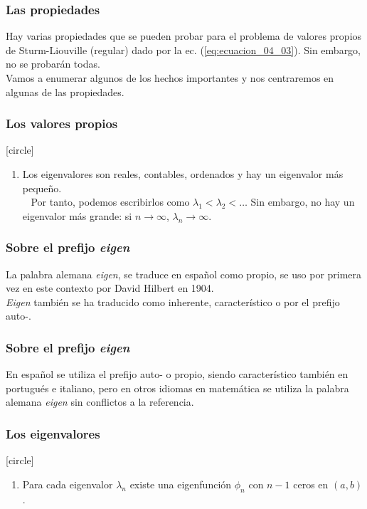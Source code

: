 \documentclass[12pt]{beamer}
\begin{document}
\begin{frame}
\frametitle{Las propiedades}
Hay varias propiedades que se pueden probar para el problema de valores propios de Sturm-Liouville (regular) dado por la ec. (\ref{eq:ecuacion_04_03}). Sin embargo, no se probarán todas.
\\
\bigskip
\pause
Vamos a enumerar algunos de los hechos importantes y nos centraremos en algunas de las propiedades.
\end{frame}
\begin{frame}
\frametitle{Los valores propios}
[circle]
\begin{enumerate}[<+->]
\item Los eigenvalores son reales, contables, ordenados y hay un eigenvalor más pequeño.
\\\
\bigskip
\pause
Por tanto, podemos escribirlos como $\lambda_{1} < \lambda_{2} < \ldots $ Sin embargo, no hay un eigenvalor más grande: si $n \to \infty$, $\lambda_{n} \to \infty$.
\seti
\end{enumerate}
\end{frame}
\begin{frame}
\frametitle{Sobre el prefijo \emph{eigen}}
La palabra alemana \emph{eigen}, se traduce en español como propio, se uso por primera vez en este contexto por David Hilbert en 1904.
\\
\bigskip
\pause
\emph{Eigen} también se ha traducido como inherente, característico o por el prefijo auto-. 
\end{frame}
\begin{frame}
\frametitle{Sobre el prefijo \emph{eigen}}
En español se utiliza el prefijo auto- o propio, siendo característico también en portugués e italiano, pero en otros idiomas en matemática se utiliza la palabra alemana \emph{eigen} sin conflictos a la referencia.
\end{frame}
\begin{frame}
\frametitle{Los eigenvalores}
[circle]
\begin{enumerate}[<+->]
\conti
\item Para cada eigenvalor $\lambda_{n}$ existe una eigenfunción $\phi_{n}$ con $n - 1$ ceros en $(a, b)$.
\seti
\end{enumerate}
\end{frame}
\end{document}
